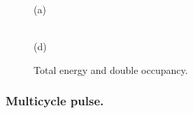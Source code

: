 \begin{figure}[h!]
\begin{minipage}[h]{0.5\linewidth}
 (a) \\
\end{minipage}
\hfill
\begin{minipage}[h]{0.5\linewidth}
 \\(d)
\end{minipage}
\caption{Total energy and double occupancy.}
\label{fig:Etot_4}
\end{figure}

\clearpage




\subsubsection{Multicycle pulse.}

